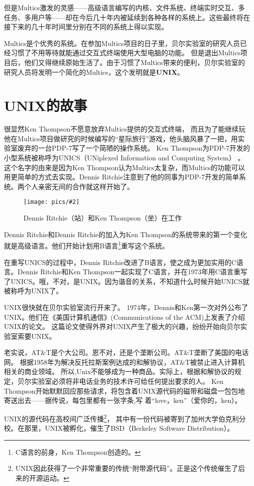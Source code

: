\documentclass[amstex]{ctexbook}
\newcommand{\chatu}[3][0.35]{%
\begin{figure}[h]%
\centering%
\texttt{[image: pics/\#2]}%
\caption{#3\label{fig:#2}}%
\end{figure}%
}
\begin{document}
但是Multics激发的灵感------高级语言编写的内核、文件系统、终端实时交互、多任务、多用户等------却在今后几十年内被延续到各种各样的系统上。这些最终将在接下来的几十年时间里分别在不同的系统上得以实现。

Multics是个优秀的系统。在参加Multics项目的日子里，贝尔实验室的研究人员已经习惯了不用等待就能通过交互式终端使用大型电脑的功能。
但是退出Multics项目后，他们又得继续原始生活了。由于习惯了Multics带来的便利，贝尔实验室的研究人员将发明一个简化的Multics，这个发明就是\textbf{UNIX}。

\section{UNIX的故事}

很显然Ken Thompson不愿意放弃Multics提供的交互式终端，
而且为了能继续玩他在Multics项目做研究的时候编写的“星际旅行”游戏，他头脑风暴了一把，用实验室废弃的一台PDP-7写了一个简陋的操作系统。
Ken Thompson为PDP-7开发的小型系统被称呼为UNICS（UNiplexed Information and Computing System） 。 这个名字的由来是因为Ken Thompson认为Multics太复杂，而Multics的功能可以用更简单的方式去实现。Dennis Ritchie注意到了他的同事为PDP-7开发的简单系统。两个人亲密无间的合作就这样开始了。

\chatu[0.2]{KandRwithPDP7}{Dennis Ritchie（站）和Ken Thompson（坐）在工作}

Dennis Ritchie和Dennis Ritchie的加入为Ken Thompson的系统带来的第一个变化就是高级语言。他们开始计划用B语言\footnote{C语言的前身，Ken Thompson创造的。}重写这个系统。

在重写UNICS的过程中，Dennis Ritchie改进了B语言，使之成为更加实用的C语言。Dennis Ritchie和Ken Thompson一起实现了C语言，并在1973年用C语言重写了UNICS。哦，不对，是UNIX。因为谐音的关系，不知道什么时候开始UNICS就被称呼为UNIX了。

UNIX很快就在贝尔实验室流行开来了。
1974年，Dennis和Ken第一次对外公布了UNIX。他们在《美国计算机通信》(Communications of the ACM)上发表了介绍UNIX的论文。
这篇论文使得外界对UNIX产生了极大的兴趣，纷纷开始向贝尔实验室索要UNIX。

老实说，AT\&T是个大公司。恩不对，还是个垄断公司。AT\&T垄断了美国的电话网。
根据1958年为解决反托拉斯案例达成的和解协议，AT\&T被禁止进入计算机相关的商业领域。
所以,Unix不能够成为一种商品。实际上，根据和解协议的规定，贝尔实验室必须将非电话业务的技术许可给任何提出要求的人。
Ken Thompson开始默默回应那些请求，将包含着UNIX源代码的磁带和磁盘一包包地寄送出去——据传说，每包里都有一张字条,写
着“love，ken”（爱你的，ken）。

UNIX的源代码在高校间广泛传播\footnote{UNIX因此获得了一个非常重要的传统“附带源代码”。正是这个传统催生了后来的开源运动。}，
其中有一份代码被寄到了加州大学伯克利分校。在那里，UNIX被孵化，催生了BSD（Berkeley Software Distribution）。
\end{document}

